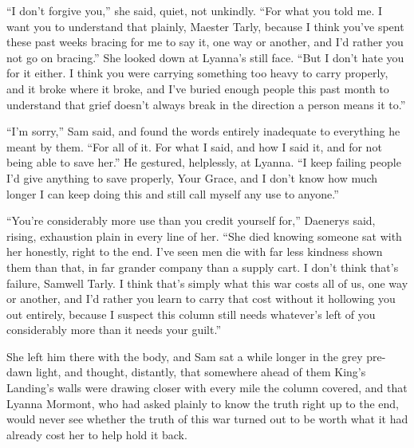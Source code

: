 “I don’t forgive you,” she said, quiet, not unkindly. “For what you told me. I want you to understand that plainly, Maester Tarly, because I think you’ve spent these past weeks bracing for me to say it, one way or another, and I’d rather you not go on bracing.” She looked down at Lyanna’s still face. “But I don’t hate you for it either. I think you were carrying something too heavy to carry properly, and it broke where it broke, and I’ve buried enough people this past month to understand that grief doesn’t always break in the direction a person means it to.”

“I’m sorry,” Sam said, and found the words entirely inadequate to everything he meant by them. “For all of it. For what I said, and how I said it, and for not being able to save her.” He gestured, helplessly, at Lyanna. “I keep failing people I’d give anything to save properly, Your Grace, and I don’t know how much longer I can keep doing this and still call myself any use to anyone.”

“You’re considerably more use than you credit yourself for,” Daenerys said, rising, exhaustion plain in every line of her. “She died knowing someone sat with her honestly, right to the end. I’ve seen men die with far less kindness shown them than that, in far grander company than a supply cart. I don’t think that’s failure, Samwell Tarly. I think that’s simply what this war costs all of us, one way or another, and I’d rather you learn to carry that cost without it hollowing you out entirely, because I suspect this column still needs whatever’s left of you considerably more than it needs your guilt.”

She left him there with the body, and Sam sat a while longer in the grey pre-dawn light, and thought, distantly, that somewhere ahead of them King’s Landing’s walls were drawing closer with every mile the column covered, and that Lyanna Mormont, who had asked plainly to know the truth right up to the end, would never see whether the truth of this war turned out to be worth what it had already cost her to help hold it back.